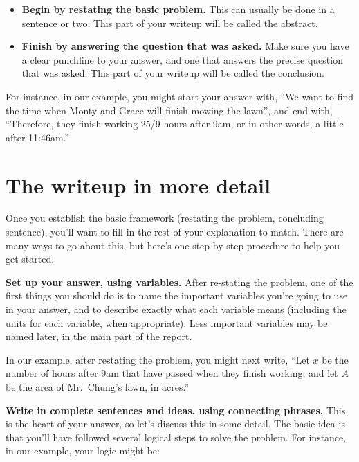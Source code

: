 \documentclass{article}
\begin{document}
\begin{itemize}

\item \textbf{Begin by restating the basic problem.} This can usually be done in a sentence or two. This part of your writeup will be called the abstract.

\item \textbf{Finish by answering the question that was asked.} Make sure you have a clear punchline to your answer, and one that answers the precise question that was asked. This part of your writeup will be called the conclusion.

\end{itemize}

For instance, in our example, you might start your answer with, ``We want to find the time when Monty and Grace will finish mowing the lawn'', and end with, ``Therefore, they finish working 25/9 hours after 9am, or in other words, a little after 11:46am.''

\section*{The writeup in more detail}

Once you establish the basic framework (restating the problem, concluding sentence), you'll want to fill in the rest of your explanation to match. There are many ways to go about this, but here's one step-by-step procedure to help you get started.

\textbf{Set up your answer, using variables.} After re-stating the problem, one of the first things you should do is to name the important variables you're going to use in your answer, and to describe exactly what each variable means (including the units for each variable, when appropriate). Less important variables may be named later, in the main part of the report.

In our example, after restating the problem, you might next write, ``Let $x$ be the number of hours after 9am that have passed when they finish working, and let $A$ be the area of Mr.\ Chung's lawn, in acres.''

\textbf{Write in complete sentences and ideas, using connecting phrases.} This is the heart of your answer, so let's discuss this in some detail. The basic idea is that you'll have followed several logical steps to solve the problem. For instance, in our example, your logic might be:
\end{document}
